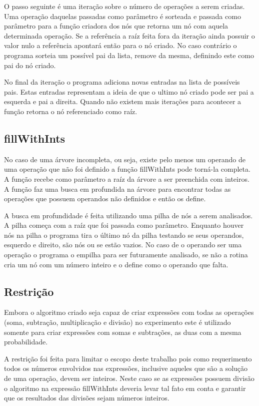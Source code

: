	O passo seguinte é uma iteração sobre o número de operações a serem criadas. Uma operação daquelas passadas como parâmetro é sorteada e passada como parâmetro para a função criadora dos nós que retorna um nó com aquela determinada operação. Se a referência a raíz feita fora da iteração ainda possuir o valor nulo a referência apontará então para o nó criado. No caso contrário o programa sorteia um possível pai da lista, remove da mesma, definindo este como pai do nó criado. 
	
	No final da iteração o programa adiciona novas entradas na lista de possíveis pais. Estas entradas representam a ideia de que o ultimo nó criado pode ser pai a esquerda e pai a direita. Quando não existem mais iterações para acontecer a função retorna o nó referenciado como raíz.
	
\subsection{fillWithInts}
No caso de uma árvore incompleta, ou seja, existe pelo menos um operando de uma operação que não foi definido a função fillWithInts pode torná-la completa. A função recebe como parâmetro a raíz da árvore a ser preenchida com inteiros. A função faz uma busca em profundida na árvore para encontrar todas as operações que possuem operandos não definidos e então os define.

	A busca em profundidade é feita utilizando uma pilha de nós a serem analisados. A pilha começa com a raíz que foi passada como parâmetro. Enquanto houver nós na pilha o programa tira o último nó da pilha testando se seus operandos, esquerdo e direito, são nós ou se estão vazios. No caso de o operando ser uma operação o programa o empilha para ser futuramente analisado, se não a rotina cria um nó com um número inteiro e o define como o operando que falta.
	
\subsection{Restrição}
Embora o algoritmo criado seja capaz de criar expressões com todas as operações (soma, subtração, multiplicação e divisão) no experimento este é utilizado somente para criar expressões com somas e subtrações, as duas com a mesma probabilidade.

	A restrição foi feita para limitar o escopo deste trabalho pois como requerimento todos os números envolvidos nas expressões, inclusive aqueles que são a solução de uma operação, devem ser inteiros. Neste caso se as expressões possuem divisão o algoritmo na expressão fillWithInts deveria levar tal fato em conta e garantir que os resultados das divisões sejam números inteiros.

